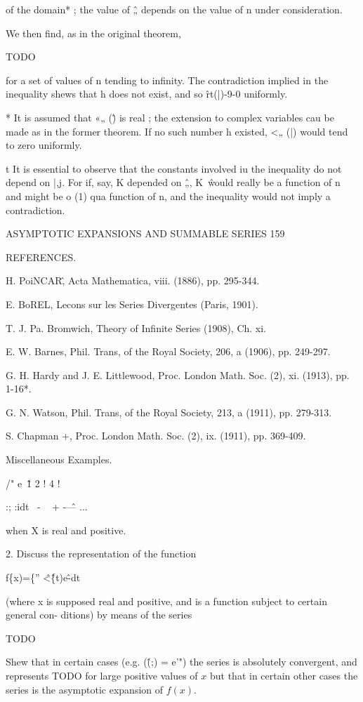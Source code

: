of the domain* ; the value of \^„ depends on the value of n under consideration. 

We then find, as in the original theorem, 

TODO

for a set of values of n tending to infinity. The contradiction implied in the inequality 
shews that h does not exist, and so \^rt(|)-9-0 uniformly. 

* It is assumed that «„ (\^) is real ; the extension to complex variables cau be made as in the 
former theorem. If no such number h existed, <„ (|) would tend to zero uniformly. 

t It is essential to observe that the constants involved iu the inequality do not depend on |,j. 
For if, say, K depended on \^„, K~\^ would really be a function of n and might be o (1) qua function 
of n, and the inequality would not imply a contradiction. 



ASYMPTOTIC EXPANSIONS AND SUMMABLE SERIES 159 

REFERENCES. 

H. PoiNCAR\^, Acta Mathematica, viii. (1886), pp. 295-344. 

E. BoREL, Lecons sur les Series Divergentes (Paris, 1901). 

T. J. Pa. Bromwich, Theory of Infinite Series (1908), Ch. xi. 

E. W. Barnes, Phil. Trans, of the Royal Society, 206, a (1906), pp. 249-297. 

G. H. Hardy and J. E. Littlewood, Proc. London Math. Soc. (2), xi. (1913), pp. 1-16*. 

G. N. Watson, Phil. Trans, of the Royal Society, 213, a (1911), pp. 279-313. 

S. Chapman +, Proc. London Math. Soc. (2), ix. (1911), pp. 369-409. 

Miscellaneous Examples. 

/" e~\^ 1 2 ! 4 ! 

:; :idt~ - ~ + -\^ — ... 

when X is real and positive. 

2. Discuss the representation of the function 

f\{x)=\{'' \^<\^\{t)e\^-dt 

(where x is supposed real and positive, and is a function subject to certain general con- 
ditions) by means of the series 

TODO

Shew that in certain cases (e.g. (\^(;) = e'") the series is absolutely convergent, and 
represents TODO for large positive values of $x$ but that in certain other cases the series is 
the asymptotic expansion of $f(x)$.



